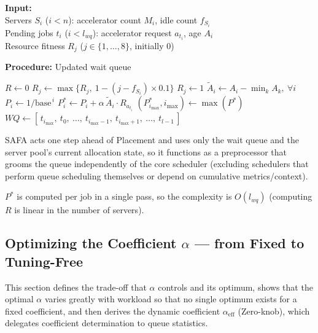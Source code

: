 \documentclass{ieeetj}
\begin{document}
\begin{algorithm}
\caption{Starvation-Aware Queue Adjustment}\label{alg:adjust_wait_queue}
\textbf{Input:} \\
\hspace*{4mm} Servers $S_i$ ($i{<}n$): accelerator count $M_i$, idle count $f_{S_i}$ \\
\hspace*{4mm} Pending jobs $t_i$ ($i{<}l_{wq}$): accelerator request $a_{t_i}$, age $A_i$ \\
\hspace*{4mm} Resource fitness $R_j$ ($j\in\{1,\ldots,8\}$, initially 0)
\begin{flushleft}
\textbf{Procedure:} Updated wait queue
\end{flushleft}
\begin{algorithmic}[1]
\STATE $R \gets 0$
\STATE {}
            \STATE $R_j \gets \max\{R_j,\ 1 - ( j - f_{S_i} ) \times 0.1\}$ 
        \ELSE
            \STATE $R_j \gets 1$ 
        \ENDIF
    \ENDFOR
\ENDFOR
\STATE {}
\STATE $\tilde A_i \gets A_i - \min_k A_k,\ \forall i$ 
    \STATE $P_i \gets 1/\text{base}^{\,i}$ 
    \STATE $P_i^* \gets P_i + \alpha\, \tilde A_i \cdot R_{a_{t_i}}$
\ENDFOR
\STATE {}
\STATE $(P_{i_{\max}}^*, i_{\max}) \gets \max(P^*)$
    \STATE $WQ \gets [\,t_{i_{\max}},\ t_0,\ \ldots,\ t_{i_{\max}-1},\ t_{i_{\max}+1},\ \ldots,\ t_{l-1}\,]$
\ENDIF
\end{algorithmic}
\end{algorithm}

SAFA acts one step ahead of Placement and uses only the wait queue and the server pool's current allocation state, so it functions as a preprocessor that grooms the queue independently of the core scheduler (excluding schedulers that perform queue scheduling themselves or depend on cumulative metrics/context).

$P^*$ is computed per job in a single pass, so the complexity is $O(l_{wq})$ (computing $R$ is linear in the number of servers).

\subsection{Optimizing the Coefficient $\alpha$ --- from Fixed to Tuning-Free}\label{sec:coeff}
This section defines the trade-off that $\alpha$ controls and its optimum, shows that the optimal $\alpha$ varies greatly with workload so that no single optimum exists for a fixed coefficient, and then derives the dynamic coefficient $\alpha_{\text{eff}}$ (Zero-knob), which delegates coefficient determination to queue statistics.
\end{document}
